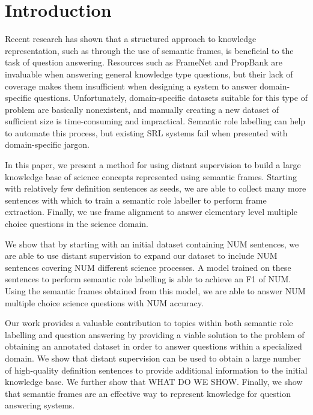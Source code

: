 \section{Introduction}

Recent research has shown that a structured approach to knowledge representation, such as through the use of semantic frames, is beneficial to the task of question answering. Resources such as FrameNet and PropBank are invaluable when answering general knowledge type questions, but their lack of coverage makes them insufficient when designing a system to answer domain-specific questions. Unfortunately, domain-specific datasets suitable for this type of problem are basically nonexistent, and manually creating a new dataset of sufficient size is time-consuming and impractical. Semantic role labelling can help to automate this process, but existing SRL systems fail when presented with domain-specific jargon.

In this paper, we present a method for using distant supervision to build a large knowledge base of science concepts represented using semantic frames. Starting with relatively few definition sentences as seeds, we are able to collect many more sentences with which to train a semantic role labeller to perform frame extraction. Finally, we use frame alignment to answer elementary level multiple choice questions in the science domain.

We show that by starting with an initial dataset containing NUM sentences, we are able to use distant supervision to expand our dataset to include NUM sentences covering NUM different science processes. A model trained on these sentences to perform semantic role labelling is able to achieve an F1 of NUM. Using the semantic frames obtained from this model, we are able to answer NUM multiple choice science questions with NUM accuracy.

Our work provides a valuable contribution to topics within both semantic role labelling and question answering by providing a viable solution to the problem of obtaining an annotated dataset in order to answer questions within a specialized domain. We show that distant supervision can be used to obtain a large number of high-quality definition sentences to provide additional information to the initial knowledge base. We further show that WHAT DO WE SHOW. Finally, we show that semantic frames are an effective way to represent knowledge for question answering systems.